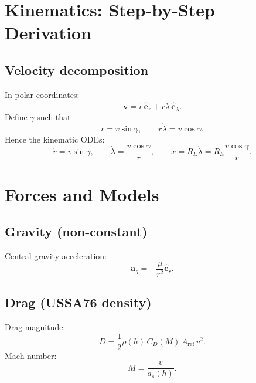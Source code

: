 \documentclass[11pt]{article}
\begin{document}
\section{Kinematics: Step-by-Step Derivation}
\subsection{Velocity decomposition}
In polar coordinates:
\begin{equation}
\bm{v}=\dot r\,\hat{\bm e}_r+r\dot\lambda\,\hat{\bm e}_\lambda.
\end{equation}
Define $\gamma$ such that
\begin{equation}
\dot r=v\sin\gamma,\qquad r\dot\lambda=v\cos\gamma.
\end{equation}
Hence the kinematic ODEs:
\begin{equation}
\boxed{\dot r=v\sin\gamma},\qquad
\boxed{\dot\lambda=\frac{v\cos\gamma}{r}},\qquad
\boxed{\dot x=R_E\dot\lambda=R_E\frac{v\cos\gamma}{r}}.
\end{equation}

\section{Forces and Models}
\subsection{Gravity (non-constant)}
Central gravity acceleration:
\begin{equation}
\bm{a}_g=-\frac{\mu}{r^2}\hat{\bm e}_r.
\end{equation}

\subsection{Drag (USSA76 density)}
Drag magnitude:
\begin{equation}
\boxed{D=\frac{1}{2}\rho(h)\,C_D(M)\,A_{\text{ref}}\,v^2.}
\end{equation}
Mach number:
\begin{equation}
M=\frac{v}{a_s(h)}.
\end{equation}
\end{document}
